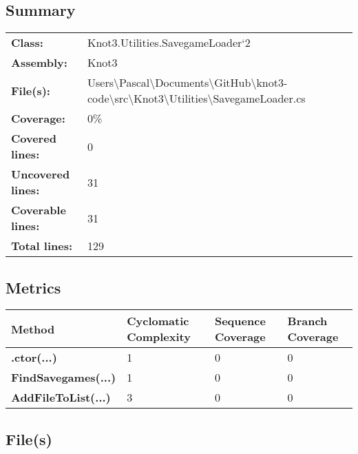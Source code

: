 \documentclass[a4paper,10pt]{article}
\begin{document}
\subsection{Summary}
\begin{longtable}[l]{ll}
\textbf{Class:} & Knot3.Utilities.SavegameLoader`2\\
\textbf{Assembly:} & Knot3\\
\textbf{File(s):} & \begin{minipage}[t]{12cm}{Users\textbackslash Pascal\textbackslash Documents\textbackslash GitHub\textbackslash knot3-code\textbackslash src\textbackslash Knot3\textbackslash Utilities\textbackslash SavegameLoader.cs}\end{minipage} \\
\textbf{Coverage:} & 0\%\\
\textbf{Covered lines:} & 0\\
\textbf{Uncovered lines:} & 31\\
\textbf{Coverable lines:} & 31\\
\textbf{Total lines:} & 129\\
\end{longtable}
\subsection{Metrics}
\begin{longtable}[l]{|l|l|l|l|}
\hline
\textbf{Method} & \textbf{Cyclomatic Complexity} & \textbf{Sequence Coverage} & \textbf{Branch Coverage}\\
\hline
\textbf{.ctor(...)} & 1 & 0 & 0\\
\hline
\textbf{FindSavegames(...)} & 1 & 0 & 0\\
\hline
\textbf{AddFileToList(...)} & 3 & 0 & 0\\
\hline
\end{longtable}
\subsection{File(s)}
\end{document}
